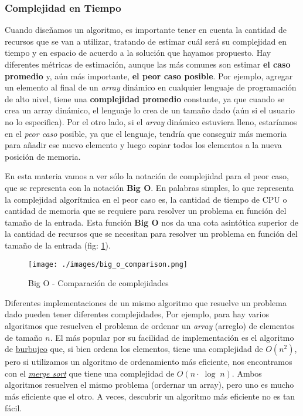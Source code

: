 \subsubsection{Complejidad en Tiempo}

Cuando diseñamos un algoritmo, es importante tener en cuenta la cantidad de recursos que se van a utilizar, tratando de
estimar cuál será su complejidad en tiempo y en espacio de acuerdo a la solución que hayamos propuesto. Hay diferentes
métricas de estimación, aunque las más comunes son estimar \textbf{el caso promedio} y, aún más importante, \textbf{el
peor caso posible}. Por ejemplo, agregar un elemento al final de un \textit{array} dinámico en cualquier lenguaje de
programación de alto nivel, tiene una \textbf{complejidad promedio} constante, ya que cuando se crea un array dinámico,
el lenguaje lo crea de un tamaño dado (aún si el usuario no lo especifica). Por el otro lado, si el \textit{array}
dinámico estuviera lleno, estaríamos en el \textit{peor caso} posible, ya que el lenguaje, tendría que conseguir más
memoria para añadir ese nuevo elemento y luego copiar todos los elementos a la nueva posición de memoria.

En esta materia vamos a ver sólo la notación de complejidad para el peor caso, que se representa con la notación
\textbf{Big O}. En palabras simples, lo que representa la complejidad algorítmica en el peor caso es, la cantidad de
tiempo de CPU o cantidad de memoria que se requiere para resolver un problema en función del tamaño de la entrada. Esta
función \textbf{Big O} nos da una cota asintótica superior de la cantidad de recursos que se necesitan para resolver un
problema en función del tamaño de la entrada (fig: \ref{fig:big_o_comparison}).

\begin{figure}[H]
  \centering
  \texttt{[image: ./images/big\_o\_comparison.png]}
  \caption{Big O - Comparación de complejidades}
  \label{fig:big_o_comparison}
\end{figure}

Diferentes implementaciones de un mismo algoritmo que resuelve un problema dado pueden tener diferentes complejidades,
Por ejemplo, para hay varios algoritmos que resuelven el problema de ordenar un \textit{array} (arreglo) de elementos de
tamaño $n$. El más popular por su facilidad de implementación es el algoritmo de
\href{https://es.wikipedia.org/wiki/Ordenamiento_de_burbuja}{burbujeo} que, si bien ordena los elementos, tiene una
complejidad de $O(n^2)$, pero si utilizamos un algoritmo de ordenamiento más eficiente, nos encontramos con el
\href{https://es.wikipedia.org/wiki/Ordenamiento_por_mezcla}{\textit{merge sort}} que tiene una complejidad de $O(n
\cdot \; \log \; n)$. Ambos algoritmos resuelven el mismo problema (ordernar un array), pero uno es mucho más eficiente
que el otro. A veces, descubrir un algoritmo más eficiente no es tan fácil.

